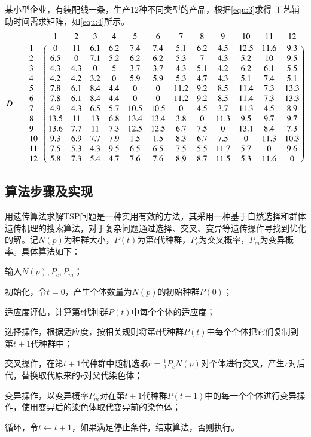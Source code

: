 某小型企业，有装配线一条，生产12种不同类型的产品，根据\eqref{equ:3}求得
工艺辅助时间需求矩阵，如\eqref{equ:4}所示。
\begin{equation}
D =\quad \bordermatrix{
	~ & 1 & 2 & 3 & 4 & 5 & 6 & 7 & 8 & 9 & 10 & 11 & 12\cr
	1 & 0 & 11 & 6.1 & 6.2 & 7.4 & 7.4 & 5.1 & 6.2 & 4.5 & 12.5 & 11.6 & 9.3\cr
	2 & 6.5 & 0 & 7.1 & 5.2 & 6.2 & 6.2 & 5.3 & 7 & 4.3 & 5.2 & 10 & 9.5\cr
	3 & 4.3 & 4.3 & 0 & 5 & 3.7 & 3.7 & 4.3 & 5.1 & 4.2 & 6.2 & 6.1 & 5.5\cr
	4 & 4.2 & 4.2 & 3.2 & 0 & 5.9 & 5.9 & 5.3 & 4.7 & 4.3 & 5.1 & 7.4 & 5.1\cr
	5 & 7.8 & 6.1 & 8.4 & 4.4 & 0 & 0 & 11.2 & 9.2 & 8.5 & 11.4 & 7.3 & 13.3\cr
	6 & 7.8 & 6.1 & 8.4 & 4.4 & 0 & 0 & 11.2 & 9.2 & 8.5 & 11.4 & 7.3 & 13.3\cr
	7 & 4.9 & 4.3 & 6.5 & 5.7 & 10.5 & 10.5 & 0 & 4.5 & 3.7 & 11.3 & 4.5 & 8.9\cr
	8 & 13.5 & 11 & 13 & 6.8 & 13.4 & 13.4 & 3.8 & 0 & 11.3 & 9.5 & 9.7 & 9.7 \cr
	9 & 13.6 & 7.7 & 11 & 7.3 & 12.5 & 12.5 & 6.7 & 7.5 & 0 & 13.1 & 8.4 & 7.3\cr
	10 & 9.3 & 6.9 & 7.7 & 7.9 & 1.5 & 1.5 & 8.3 & 6.7 & 7.5 & 0 & 11.3 & 10.3\cr
	11 & 7.5 & 5.3 & 4.3 & 9.5 & 6.5 & 6.5 & 7.5 & 5.5 & 11.7 & 5.7 & 0 & 9.6\cr
	12 & 5.8 & 7.3 & 5.4 & 4.7 & 7.6 & 7.6 & 8.9 & 8.7 & 11.5 & 5.3 & 11.6 & 0 
}\label{equ:4}
\end{equation}
\subsection{算法步骤及实现}
用遗传算法求解TSP问题是一种实用有效的方法，其采用一种基于自然选择和群体遗传机理的搜索算法，对于复杂问题通过选择、交叉、变异等遗传操作寻找到优化的解。记$N(p)$为种群大小，$P(t)$为第$t$代种群，$P_c$为交叉概率，$P_m$为变异概率。具体算法如下：
\begin{asparaenum}
\renewcommand{\labelenumi}{\heiti 步骤\theenumi~}
\item 输入$N(p), P_c, P_m$；
\item 初始化，令$t = 0$，产生个体数量为$N(p)$的初始种群$P(0)$；
\item 适应度评估，计算第$t$代种群$P(t)$中每个个体的适应度；
\item 选择操作，根据适应度，按相关规则将第$t$代种群$P(t)$中每个个体把它们复制到第$t+1$代种群中；
\item 交叉操作，在第$t+1$代种群中随机选取$r = \frac{1}{2}P_cN(p)$对个体进行交叉，产生$r$对后代，替换取代原来的$r$对父代染色体；
\item 变异操作，以变异概率$P_m$对在第$t+1$代种群$P(t+1)$中的每一个个体进行变异操作，使用变异后的染色体取代变异前的染色体；
\item 循环，令$t\leftarrow t+1$，如果满足停止条件，结束算法，否则执行。
\end{asparaenum}

